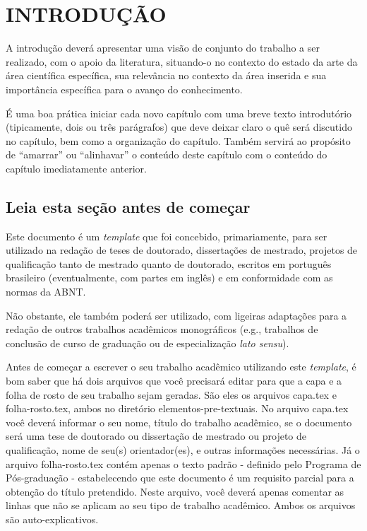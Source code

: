
\chapter{INTRODUÇÃO}
\label{chap:introducao}

A introdução deverá apresentar uma visão de conjunto do trabalho a ser realizado, com o apoio da literatura, situando-o no contexto do estado da arte da área científica específica, sua relevância no contexto da área inserida e sua importância específica para o avanço do conhecimento.

É uma boa prática iniciar cada novo capítulo com uma breve texto introdutório (tipicamente, dois ou três parágrafos) que deve deixar claro o quê será discutido no capítulo, bem como a organização do capítulo.
Também servirá ao propósito de ``amarrar'' ou ``alinhavar'' o conteúdo deste capítulo com o conteúdo do capítulo imediatamente anterior.

\section{Leia esta seção antes de começar}
\label{sec:leia_esta_secao_antes_de_omecar}

Este documento é um \emph{template} que foi concebido, primariamente, para ser utilizado na redação de teses de doutorado, dissertações de mestrado, projetos de qualificação tanto de mestrado quanto de doutorado, escritos em português brasileiro (eventualmente, com partes em inglês) e em conformidade com as normas da ABNT.

Não obstante, ele também poderá ser utilizado, com ligeiras adaptações para a redação de outros trabalhos acadêmicos monográficos (e.g., trabalhos de conclusão de curso de graduação ou de especialização \emph{lato sensu}).

Antes de começar a escrever o seu trabalho acadêmico utilizando este \emph{template}, é bom saber que há dois arquivos que você precisará editar para que a capa e a folha de rosto de seu trabalho sejam geradas.
São eles os arquivos {\ttfamily capa.tex} e {\ttfamily folha-rosto.tex}, ambos no diretório {\ttfamily elementos-pre-textuais}.
No arquivo {\ttfamily capa.tex} você deverá informar o seu nome, título do trabalho acadêmico, se o documento será uma tese de doutorado ou dissertação de mestrado ou projeto de qualificação, nome de seu(s) orientador(es), e outras informações necessárias.
Já o arquivo {\ttfamily folha-rosto.tex} contém apenas o texto padrão - definido pelo Programa de Pós-graduação - estabelecendo que este documento é um requisito parcial para a obtenção do título pretendido.
Neste arquivo, você deverá apenas comentar as linhas que não se aplicam ao seu tipo de trabalho acadêmico.
Ambos os arquivos são auto-explicativos.


